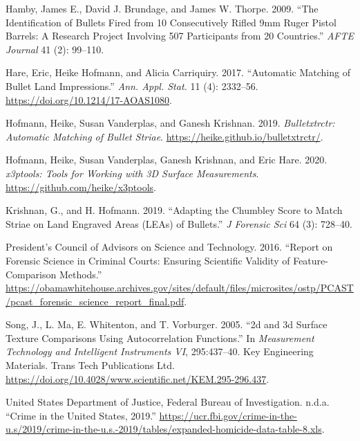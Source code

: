 \begin{CSLReferences}{1}{0}
\leavevmode{}%
Hamby, James E., David J. Brundage, and James W. Thorpe. 2009. {``{The Identification of Bullets Fired from 10 Consecutively Rifled 9mm Ruger Pistol Barrels: A Research Project Involving 507 Participants from 20 Countries}.''} \emph{AFTE Journal} 41 (2): 99--110.

\leavevmode{}%
Hare, Eric, Heike Hofmann, and Alicia Carriquiry. 2017. {``Automatic Matching of Bullet Land Impressions.''} \emph{Ann. Appl. Stat.} 11 (4): 2332--56. \url{https://doi.org/10.1214/17-AOAS1080}.

\leavevmode{}%
Hofmann, Heike, Susan Vanderplas, and Ganesh Krishnan. 2019. \emph{Bulletxtrctr: Automatic Matching of Bullet Striae}. \url{https://heike.github.io/bulletxtrctr/}.

\leavevmode{}%
Hofmann, Heike, Susan Vanderplas, Ganesh Krishnan, and Eric Hare. 2020. \emph{{x3ptools: Tools for Working with 3D Surface Measurements}}. \url{https://github.com/heike/x3ptools}.

\leavevmode{}%
Krishnan, G., and H. Hofmann. 2019. {``{{A}dapting the {C}humbley {S}core to {M}atch {S}triae on {L}and {E}ngraved {A}reas ({L}{E}{A}s) of {B}ullets}.''} \emph{J Forensic Sci} 64 (3): 728--40.

\leavevmode{}%
President's Council of Advisors on Science and Technology. 2016. {``Report on Forensic Science in Criminal Courts: Ensuring Scientific Validity of Feature-Comparison Methods.''} \url{https://obamawhitehouse.archives.gov/sites/default/files/microsites/ostp/PCAST/pcast_forensic_science_report_final.pdf}.

\leavevmode{}%
Song, J., L. Ma, E. Whitenton, and T. Vorburger. 2005. {``2d and 3d Surface Texture Comparisons Using Autocorrelation Functions.''} In \emph{Measurement Technology and Intelligent Instruments VI}, 295:437--40. Key Engineering Materials. Trans Tech Publications Ltd. \url{https://doi.org/10.4028/www.scientific.net/KEM.295-296.437}.

\leavevmode{}%
United States Department of Justice, Federal Bureau of Investigation. n.d.a. {``{Crime in the United States, 2019}.''} \url{https://ucr.fbi.gov/crime-in-the-u.s/2019/crime-in-the-u.s.-2019/tables/expanded-homicide-data-table-8.xls}.


\end{CSLReferences}
